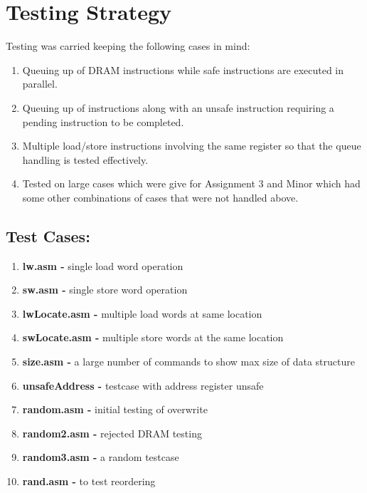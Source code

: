 \documentclass{article}
\begin{document}
\section{Testing Strategy}
Testing was carried keeping the following cases in mind:
\begin{enumerate}
    \item Queuing up of DRAM instructions while safe instructions are executed in parallel.
    \item Queuing up of instructions along with an unsafe instruction requiring a pending instruction to be completed.
    \item Multiple load/store instructions involving the same register so that the queue handling is tested effectively.
    \item Tested on large cases which were give for Assignment 3 and Minor which had some other combinations of cases that were not handled above.
\end{enumerate}
\subsection*{Test Cases:}
\begin{enumerate}
    \item \textbf{lw.asm -} single load word operation
    \item \textbf{sw.asm -} single store word operation
    \item \textbf{lwLocate.asm -} multiple load words at same location
    \item \textbf{swLocate.asm -}  multiple store words at the same location
    \item \textbf{size.asm -}  a large number of commands to show max size of data structure
    \item \textbf{unsafeAddress -} testcase with address register unsafe
    \item \textbf{random.asm -} initial testing of overwrite
    \item \textbf{random2.asm -} rejected DRAM testing
    \item \textbf{random3.asm -} a random testcase
    \item \textbf{rand.asm -} to test reordering
\end{enumerate}
\end{document}
